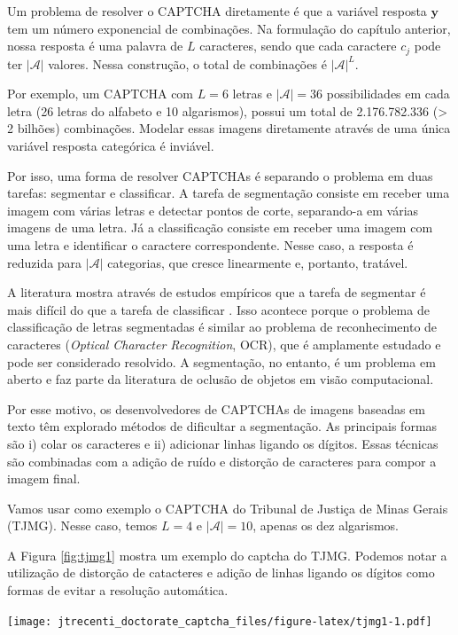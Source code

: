 \documentclass[12pt,]{report}
\let\origfigure\figure
\let\endorigfigure\endfigure
\renewenvironment{figure}[1][2] {
    \expandafter\origfigure\expandafter[H]
} {
    \endorigfigure
}
\begin{document}
Um problema de resolver o CAPTCHA diretamente é que a variável resposta
\(\mathbf y\) tem um número exponencial de combinações. Na formulação do
capítulo anterior, nossa resposta é uma palavra de \(L\) caracteres,
sendo que cada caractere \(c_j\) pode ter \(|\mathcal A|\) valores.
Nessa construção, o total de combinações é \(|\mathcal A|^L\).

Por exemplo, um CAPTCHA com \(L=6\) letras e \(|\mathcal A| = 36\)
possibilidades em cada letra (26 letras do alfabeto e 10 algarismos),
possui um total de 2.176.782.336 (\textgreater{} 2 bilhões) combinações.
Modelar essas imagens diretamente através de uma única variável resposta
categórica é inviável.

Por isso, uma forma de resolver CAPTCHAs é separando o problema em duas
tarefas: segmentar e classificar. A tarefa de segmentação consiste em
receber uma imagem com várias letras e detectar pontos de corte,
separando-a em várias imagens de uma letra. Já a classificação consiste
em receber uma imagem com uma letra e identificar o caractere
correspondente. Nesse caso, a resposta é reduzida para \(|\mathcal A|\)
categorias, que cresce linearmente e, portanto, tratável.

A literatura mostra através de estudos empíricos que a tarefa de
segmentar é mais difícil do que a tarefa de classificar
\citep{bursztein2014end}. Isso acontece porque o problema de
classificação de letras segmentadas é similar ao problema de
reconhecimento de caracteres (\emph{Optical Character Recognition},
OCR), que é amplamente estudado e pode ser considerado resolvido. A
segmentação, no entanto, é um problema em aberto e faz parte da
literatura de oclusão de objetos em visão computacional.

Por esse motivo, os desenvolvedores de CAPTCHAs de imagens baseadas em
texto têm explorado métodos de dificultar a segmentação. As principais
formas são i) colar os caracteres e ii) adicionar linhas ligando os
dígitos. Essas técnicas são combinadas com a adição de ruído e distorção
de caracteres para compor a imagem final.

Vamos usar como exemplo o CAPTCHA do Tribunal de Justiça de Minas Gerais
(TJMG). Nesse caso, temos \(L=4\) e \(|\mathcal A|=10\), apenas os dez
algarismos.

A Figura \ref{fig:tjmg1} mostra um exemplo do captcha do TJMG. Podemos
notar a utilização de distorção de catacteres e adição de linhas ligando
os dígitos como formas de evitar a resolução automática.

\begin{figure}
\centering
\texttt{[image: jtrecenti\_doctorate\_captcha\_files/figure-latex/tjmg1-1.pdf]}
\caption{\label{fig:tjmg1}CAPTCHA do TJMG.}
\end{figure}
\end{document}
